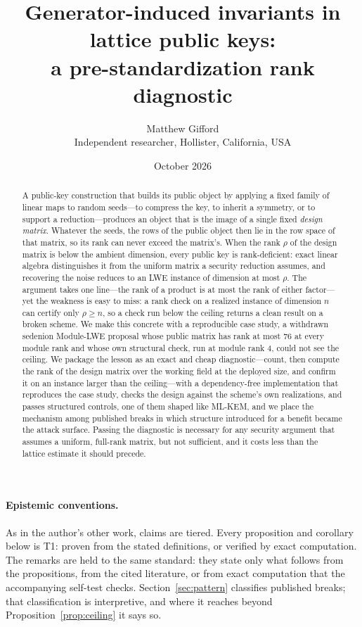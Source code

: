 \documentclass[11pt]{article}
\title{Generator-induced invariants in lattice public keys:\\ a pre-standardization rank diagnostic}
\author{Matthew Gifford\\ \small Independent researcher, Hollister, California, USA}
\date{\small October 2026}
\makeatletter
\theoremstyle{remark}
\DeclareRobustCommand{\_}{%
  \edef\@tempa{\ttdefault}%
  \ifx\f@family\@tempa\char95 \else\textunderscore\fi\penalty300\relax}
\makeatother
\begin{document}
\maketitle

\begin{abstract}
A public-key construction that builds its public object by applying a fixed family of linear maps to random
seeds---to compress the key, to inherit a symmetry, or to support a reduction---produces an object that is the image of
a single fixed \emph{design matrix}. Whatever the seeds, the rows of the public object then lie in the row space of
that matrix, so its rank can never exceed the matrix's. When the rank $\rho$ of the design matrix is below the ambient dimension, every public key is
rank-deficient: exact linear algebra distinguishes it from the uniform matrix a security reduction assumes, and
recovering the noise reduces to an LWE instance of dimension at most $\rho$. The argument takes one line---the rank of a
product is at most the rank of either factor---yet the weakness is easy to miss: a rank check on a realized instance of
dimension $n$ can certify only $\rho\ge n$, so a check run below the ceiling returns a clean result on a broken scheme.
We make this concrete with a reproducible case study, a withdrawn sedenion Module-LWE proposal whose public matrix has
rank at most 76 at every module rank and whose own structural check, run at module rank 4, could not see the ceiling.
We package the lesson as an exact and cheap diagnostic---count, then compute the rank of the design matrix over the
working field at the deployed size, and confirm it on an instance larger than the ceiling---with a dependency-free
implementation that reproduces the case study, checks the design against the scheme's own realizations, and passes
structured controls, one of them shaped like ML-KEM, and we place the mechanism among published breaks in which structure introduced for a benefit became the attack surface. Passing the diagnostic is
necessary for any security argument that assumes a uniform, full-rank matrix, but not sufficient, and it costs less than
the lattice estimate it should precede.
\end{abstract}

\paragraph{Epistemic conventions.} As in the author's other work, claims are tiered. Every proposition and corollary
below is T1: proven from the stated definitions, or verified by exact computation. The remarks are held to the same
standard: they state only what follows from the propositions, from the cited literature, or from exact computation that
the accompanying self-test checks. Section~\ref{sec:pattern} classifies published breaks; that classification is
interpretive, and where it reaches beyond Proposition~\ref{prop:ceiling} it says so.
\end{document}
